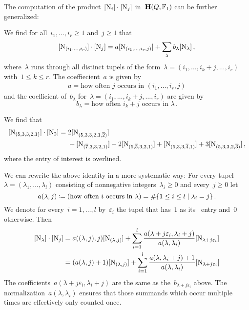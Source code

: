 \documentclass[a4paper,11pt]{scrartcl}
\begin{document}
The computation of the product~$[\mathrm{N}_i] \cdot [\mathrm{N}_j]$ in~$\mathbf{H}(Q, \mathbb{F}_1)$ can be further generalized:

We find for all~$i_1, \dotsc, i_r \geq 1$ and~$j \geq 1$ that
\[
  [ \mathrm{N}_{(i_1, \dotsc, i_r)} ] \cdot [ \mathrm{N}_j ]
  =
  a [ \mathrm{N}_{(i_1, \dotsc, i_r, j)} ]
  +
  \sum_{\lambda} b_\lambda [ \mathrm{N}_\lambda ] \,,
\]
where~$\lambda$ runs through all distinct tupels of the form~$\lambda = (i_1, \dotsc, i_k + j, \dotsc, i_r)$ with~$1 \leq k \leq r$.
The coeffiecient~$a$ is given by
\begin{align*}
  a
  =
  \text{how often~$j$ occurs in~$(i_1, \dotsc, i_r, j)$}
\end{align*}
and the coefficient of~$b_\lambda$ for~$\lambda = (i_1, \dotsc, i_k + j, \dotsc, i_r)$ are given by
\[
  b_\lambda
  =
  \text{how often~$i_k + j$ occurs in~$\lambda$} \,.
\]

\begin{example}
  We find that 
  \begin{align*}
    [ \mathrm{N}_{(5, 3, 3, 2, 1)} ] \cdot [ \mathrm{N}_2 ]
    ={}&
      2 [ \mathrm{N}_{(5, 3, 3, 2, 1, \overline{2})} ]
    \\
    {}&
    +   [ \mathrm{N}_{(\overline{7}, 3, 3, 2, 1)} ]
    + 2 [ \mathrm{N}_{(5, \overline{5}, 3, 2, 1)} ]
    +   [ \mathrm{N}_{(5, 3, 3, \overline{4}, 1)} ]
    + 3 [ \mathrm{N}_{(5, 3, 3, 2, \overline{3})} ] \,,
  \end{align*}
  where the entry of interest is overlined.
\end{example}

We can rewrite the above identity in a more systematic way:
For every tupel~$\lambda = (\lambda_1, \dotsc, \lambda_l)$ consisting of nonnegative integers~$\lambda_i \geq 0$ and every~$j \geq 0$ let
\[
  a(\lambda, j)
  \defined
  ( \text{how often~$i$ occurs in~$\lambda$} )
  =
  \counting
  \{
    1 \leq i \leq l
  \suchthat
    \lambda_i = j
  \} \,.
\]
We denote for every~$i = 1, \dotsc, l$ by~$\varepsilon_i$ the tupel that has~$1$ as its~ entry and~$0$ otherwise.
Then
\begin{align}
  \label{product formula for representations}
  [\mathrm{N}_\lambda] \cdot [\mathrm{N}_j]
  &=
  a((\lambda, j), j) [ \mathrm{N}_{(\lambda, j)} ]
  +
  \sum_{i=1}^l
  \frac{ a(\lambda + j \varepsilon_i, \lambda_i + j) }{ a(\lambda, \lambda_i) }
  [ \mathrm{N}_{\lambda + j \varepsilon_i} ]
  \\
  &=
  (a(\lambda,j) + 1) [ \mathrm{N}_{(\lambda, j)} ]
  +
  \sum_{i=1}^l
  \frac{ a(\lambda, \lambda_i + j) + 1 }{ a(\lambda, \lambda_i) }
  [ \mathrm{N}_{\lambda + j \varepsilon_i} ]
  \notag
\end{align}
The coefficients~$a(\lambda + j \varepsilon_i, \lambda_i + j)$ are the same as the~$b_{\lambda + j \varepsilon_i}$ above.
The normalization~$a(\lambda, \lambda_i)$ ensures that those summands which occur multiple times are effectively only counted once.
\end{document}
